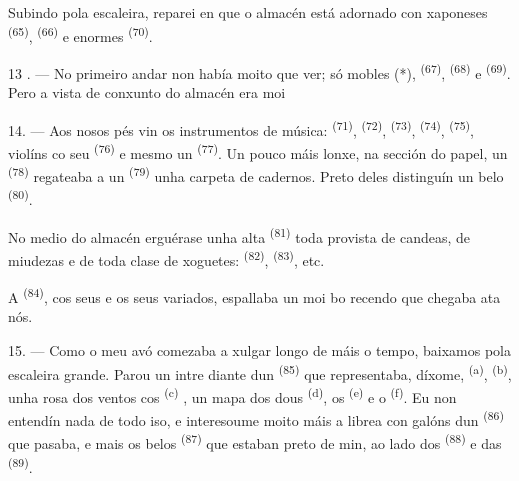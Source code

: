 Subindo pola escaleira, reparei en que o almacén está adornado con 
xaponeses \textsuperscript{(65)},  \textsuperscript{(66)} e enormes
 \textsuperscript{(70)}.

13 . --- No primeiro andar non había moito que ver; só mobles (*),  \textsuperscript{(67)},  \textsuperscript{(68)} e
 \textsuperscript{(69)}. Pero a vista de conxunto do almacén
era moi 

14. --- Aos nosos pés vin os instrumentos de música: 
\textsuperscript{(71)},  \textsuperscript{(72)},
 \textsuperscript{(73)}, 
\textsuperscript{(74)},  \textsuperscript{(75)}, violíns co seu
 \textsuperscript{(76)} e mesmo un 
\textsuperscript{(77)}. Un pouco máis lonxe, na sección do papel, un
 \textsuperscript{(78)} regateaba a un 
\textsuperscript{(79)} unha carpeta de cadernos. Preto deles distinguín un belo
 \textsuperscript{(80)}.

No medio do almacén erguérase unha alta 
\textsuperscript{(81)} toda provista de candeas, de miudezas e de toda clase de
xoguetes:  \textsuperscript{(82)}, 
\textsuperscript{(83)}, etc.

A  \textsuperscript{(84)}, cos seus  e os seus
 variados, espallaba un moi bo recendo que chegaba ata nós.

\VUsaut{3.4mm}
\VUsaut{2.8mm}

15. --- Como o meu avó comezaba a xulgar longo de máis o tempo, baixamos pola escaleira
grande. Parou un intre diante dun  \textsuperscript{(85)}
que representaba, díxome,  \textsuperscript{(a)},  \textsuperscript{(b)}, unha rosa dos ventos cos  \textsuperscript{(c)} , un mapa dos
dous  \textsuperscript{(d)}, os 
\textsuperscript{(e)} e o  \textsuperscript{(f)}. Eu non entendín
nada de todo iso, e interesoume moito máis a librea con galóns dun  \textsuperscript{(86)} que pasaba, e mais os belos 
\textsuperscript{(87)} que estaban preto de min, ao lado dos 
\textsuperscript{(88)} e das  \textsuperscript{(89)}.

